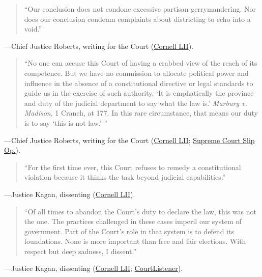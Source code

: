 \documentclass[12pt]{article}
\begin{document}
\begin{quote}
``Our conclusion does not condone excessive partisan gerrymandering. Nor does our conclusion condemn complaints about districting to echo into a void.''
\end{quote}
\noindent---Chief Justice Roberts, writing for the Court (\href{https://www.law.cornell.edu/supremecourt/text/18-422}{Cornell LII}).

\begin{quote}
``No one can accuse this Court of having a crabbed view of the reach of its competence. But we have no commission to allocate political power and influence in the absence of a constitutional directive or legal standards to guide us in the exercise of such authority. `It is emphatically the province and duty of the judicial department to say what the law is.' \textit{Marbury v. Madison}, 1 Cranch, at 177. In this rare circumstance, that means our duty is to say `this is not law.' ''
\end{quote}
\noindent---Chief Justice Roberts, writing for the Court (\href{https://www.law.cornell.edu/supremecourt/text/18-422}{Cornell LII}; \href{https://www.supremecourt.gov/opinions/18pdf/18-422_9ol1.pdf}{Supreme Court Slip Op.}).

\begin{quote}
``For the first time ever, this Court refuses to remedy a constitutional violation because it thinks the task beyond judicial capabilities.''
\end{quote}
\noindent---Justice Kagan, dissenting (\href{https://www.law.cornell.edu/supremecourt/text/18-422}{Cornell LII}).

\begin{quote}
``Of all times to abandon the Court's duty to declare the law, this was not the one. The practices challenged in these cases imperil our system of government. Part of the Court's role in that system is to defend its foundations. None is more important than free and fair elections. With respect but deep sadness, I dissent.''
\end{quote}
\noindent---Justice Kagan, dissenting (\href{https://www.law.cornell.edu/supremecourt/text/18-422}{Cornell LII}; \href{https://www.courtlistener.com/opinion/4633469/rucho-v-common-cause/}{CourtListener}).
\end{document}
